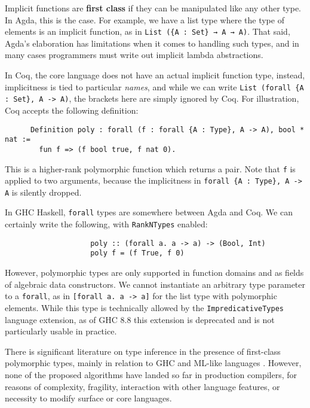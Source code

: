 \documentclass[acmsmall,review,anonymous]{acmart}\settopmatter{printfolios=true,printccs=false,printacmref=false}
\begin{document}
Implicit functions are \textbf{first class} if they can be manipulated like any
other type. In Agda, this is the case. For example, we have a list type where
the type of elements is an implicit function, as in \texttt{List (\{A : Set\} →
  A → A)}. That said, Agda's elaboration has limitations when it comes to
handling such types, and in many cases programmers must write out
implicit lambda abstractions.

In Coq, the core language does not have an actual implicit function
type, instead, implicitness is tied to particular \emph{names}, and while we can
write \texttt{List (forall \{A : Set\}, A -> A)}, the brackets here are simply
ignored by Coq. For illustration, Coq accepts the following definition:
\begin{verbatim}
      Definition poly : forall (f : forall {A : Type}, A -> A), bool * nat :=
        fun f => (f bool true, f nat 0).
\end{verbatim}
This is a higher-rank polymorphic function which returns a pair. Note that
\texttt{f} is applied to two arguments, because the implicitness in
\texttt{forall \{A : Type\}, A -> A} is silently dropped.

In GHC Haskell, \texttt{forall} types are somewhere between Agda and Coq. We can certainly write the following, with \texttt{RankNTypes} enabled:
\begin{verbatim}
                    poly :: (forall a. a -> a) -> (Bool, Int)
                    poly f = (f True, f 0)
\end{verbatim}
However, polymorphic types are only supported in function domains and as fields
of algebraic data constructors. We cannot instantiate an arbitrary type
parameter to a \texttt{forall}, as in \texttt{[forall a. a -> a]} for the list
type with polymorphic elements. While this type is technically allowed by the
\texttt{ImpredicativeTypes} language extension, as of GHC 8.8 this extension is
deprecated and is not particularly usable in practice.

There is significant literature on type inference in the presence of first-class
polymorphic types, mainly in relation to GHC and ML-like languages
\cite{TODO}. However, none of the proposed algorithms have landed so far in
production compilers, for reasons of complexity, fragility, interaction with
other language features, or necessity to modify surface or core languages.
\end{document}
